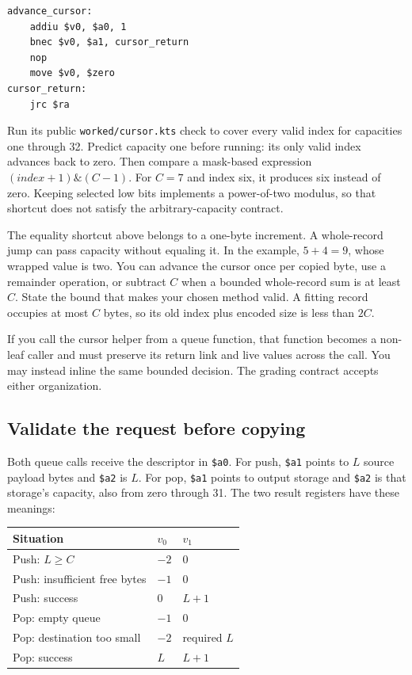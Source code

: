 \noindent\begin{minipage}{\linewidth}
  \begin{verbatim}
advance_cursor:
    addiu $v0, $a0, 1
    bnec $v0, $a1, cursor_return
    nop
    move $v0, $zero
cursor_return:
    jrc $ra
\end{verbatim}
\end{minipage}

Run its public \texttt{worked/cursor.kts} check to cover every
valid index for capacities one through 32. Predict capacity one before running:
its only valid index advances back to zero. Then compare a mask-based expression
$(index+1)\mathbin{\&}(C-1)$. For $C=7$ and index six, it produces six instead of
zero. Keeping selected low bits implements a power-of-two modulus, so that shortcut
does not satisfy the arbitrary-capacity contract.

The equality shortcut above belongs to a one-byte increment. A whole-record jump
can pass capacity without equaling it. In the example, $5+4=9$, whose wrapped value
is two. You can advance the cursor once per copied byte, use a remainder operation,
or subtract $C$ when a bounded whole-record sum is at least $C$. State the bound
that makes your chosen method valid. A fitting record occupies at most $C$ bytes,
so its old index plus encoded size is less than $2C$.

If you call the cursor helper from a queue function, that function becomes a
non-leaf caller and must preserve its return link and live values across the call.
You may instead inline the same bounded decision. The grading contract accepts
either organization.

\subsection*{Validate the request before copying}

Both queue calls receive the descriptor in \texttt{\$a0}. For push,
\texttt{\$a1} points to $L$ source payload bytes and \texttt{\$a2} is $L$.
For pop, \texttt{\$a1} points to output storage and \texttt{\$a2} is that storage's
capacity, also from zero through 31. The two result registers have these meanings:

\begin{center}
  \begin{tabular}{lll}
    \toprule
    Situation                     & $v_0$ & $v_1$        \\
    \midrule
    Push: $L\geq C$               & $-2$  & 0            \\
    Push: insufficient free bytes & $-1$  & 0            \\
    Push: success                 & 0     & $L+1$        \\
    Pop: empty queue              & $-1$  & 0            \\
    Pop: destination too small    & $-2$  & required $L$ \\
    Pop: success                  & $L$   & $L+1$        \\
    \bottomrule
  \end{tabular}
\end{center}

